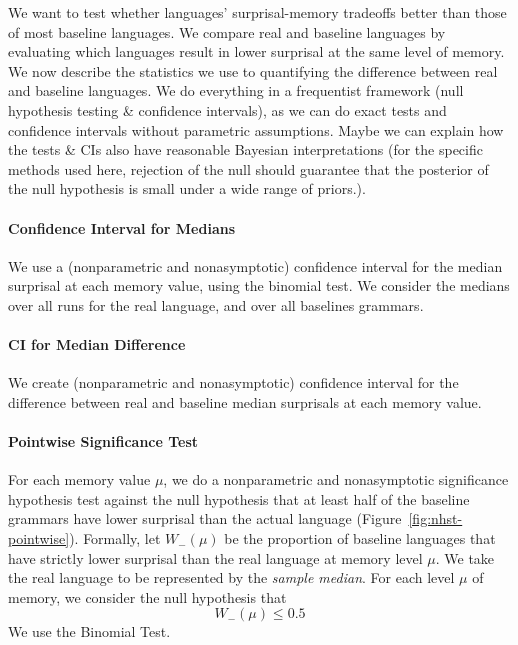 \documentclass[11pt,letterpaper]{article}
\begin{document}
We want to test whether languages' surprisal-memory tradeoffs better than those of most baseline languages.
We compare real and baseline languages by evaluating which languages result in lower surprisal at the same level of memory.
We now describe the statistics we use to quantifying the difference between real and baseline languages.
We do everything in a frequentist framework (null hypothesis testing \& confidence intervals), as we can do exact tests and confidence intervals without parametric assumptions.
Maybe we can explain how the tests \& CIs also have reasonable Bayesian interpretations (for the specific methods used here, rejection of the null should guarantee that the posterior of the null hypothesis is small under a wide range of priors.).

\paragraph{Confidence Interval for Medians}
We use a (nonparametric and nonasymptotic) confidence interval for the median surprisal at each memory value, using the binomial test.
We consider the medians over all runs for the real language, and over all baselines grammars.



\paragraph{CI for Median Difference}
We create (nonparametric and nonasymptotic) confidence interval for the difference between real and baseline median surprisals at each memory value.



\paragraph{Pointwise Significance Test}
For each memory value $\mu$, we do a nonparametric and nonasymptotic significance hypothesis test against the null hypothesis that at least half of the baseline grammars have lower surprisal than the actual language (Figure~\ref{fig:nhst-pointwise}).
Formally, let $W_-(\mu)$ be the proportion of baseline languages that have strictly lower surprisal than the real language at memory level $\mu$.
We take the real language to be represented by the \emph{sample median}.
For each level $\mu$ of memory, we consider the null hypothesis that
\begin{equation}
	W_-(\mu) \leq 0.5
\end{equation}
We use the Binomial Test.
\end{document}
